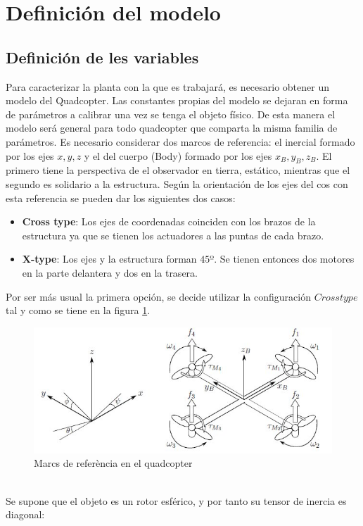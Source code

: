 \documentclass[twoside]{article}
\begin{document}
\newpage
\section{Definición del modelo} \label{model}
\subsection{Definición de les variables}
Para caracterizar la planta con la que es trabajará, es necesario obtener un modelo del Quadcopter. Las constantes propias del modelo se dejaran en forma de parámetros a calibrar una vez se tenga el objeto físico. De esta manera el modelo será general para todo quadcopter que comparta la misma familia de parámetros.
Es necesario considerar dos marcos de referencia: el inercial formado por los ejes $x,y,z$ y el del cuerpo (Body) formado por los ejes $x_B,y_B,z_B$. El primero tiene la perspectiva de el observador en tierra, estático, mientras que el segundo es solidario a la estructura. Según la orientación de los ejes del cos con esta referencia se pueden dar los siguientes dos casos:
\begin{itemize}
\item \textbf{Cross type}: Los ejes de coordenadas coinciden con los brazos de la estructura ya que se tienen los actuadores a las puntas de cada brazo.
\item \textbf{X-type}: Los ejes y la estructura forman $45º$. Se tienen entonces dos motores en la parte delantera y dos en la trasera.
\end{itemize} 
Por ser más usual la primera opción, se decide utilizar la configuración $Cross type$ tal y como se tiene en la figura \ref{RefQuad}.
\begin{figure}[h!]
\centering
\includegraphics[scale=0.5]{images/quad.jpg}
\caption{Marcs de referència en el quadcopter}
\label{RefQuad}
\end{figure}\\
Se supone que el objeto es un rotor esférico, y por tanto su tensor de inercia es diagonal:
\end{document}
